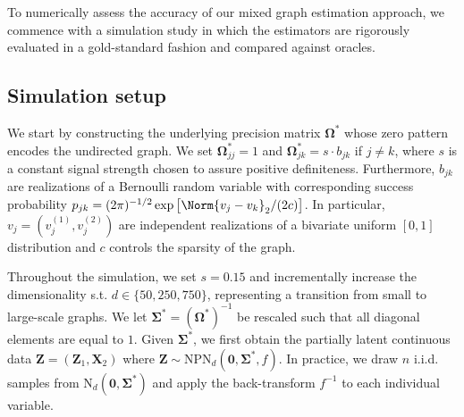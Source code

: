 To numerically assess the accuracy of our mixed graph estimation approach, we commence with a simulation study in which the estimators are rigorously evaluated in a gold-standard fashion and compared against oracles.

\subsection{Simulation setup}\label{sec::setup}





We start by constructing the underlying precision matrix $\mathbf{\Omega}^*$ whose zero pattern encodes the undirected graph. We set $\mathbf{\Omega}^*_{jj} = 1$ and $\mathbf{\Omega}_{jk}^* = s \cdot b_{jk}$ if $j\neq k$, where $s$ is a constant signal strength chosen to assure positive definiteness. Furthermore, $b_{jk}$ are realizations of a Bernoulli random variable with corresponding success probability $p_{jk} = (2\pi)^{-1/2} \exp\big[\Norm{v_j - v_k}_2 / (2c) \big]$. In particular, $v_j = (v_j^{(1)}, v_j^{(2)})$ are independent realizations of a bivariate uniform $[0,1]$ distribution and $c$ controls the sparsity of the graph.

Throughout the simulation, we set $s = 0.15$ and incrementally increase the dimensionality s.t. $d \in \{50,250,750\}$, representing a transition from small to large-scale graphs. We let $\mathbf{\Sigma}^* = (\mathbf{\Omega}^*)^{-1}$ be rescaled such that all diagonal elements are equal to $1$. Given $\mathbf\Sigma^*$, we first obtain the partially latent continuous data \(\mathbf{Z} = (\mathbf{Z}_1, \mathbf{X}_2)\) where $\mathbf{Z} \sim \text{NPN}_d(\mathbf{0}, \mathbf{\Sigma}^*, f)$. In practice, we draw \(n\) i.i.d. samples from \(\text{N}_d(\mathbf{0}, \mathbf{\Sigma}^*)\) and apply the back-transform \(f^{-1}\) to each individual variable.

